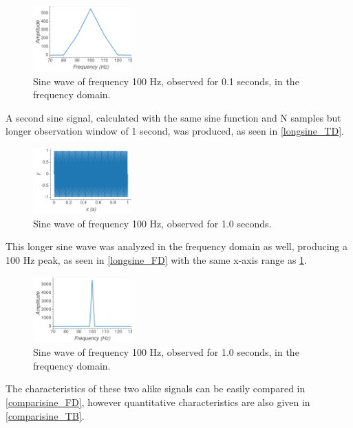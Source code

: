 \documentclass[aps,prl,reprint]{revtex4-2}
\begin{document}
\begin{figure}[h]
\includegraphics[width=0.34\textwidth]{../Images/l5_A_1b.png}
\caption{\label{shortsine_FD} Sine wave of frequency 100 Hz, observed for 0.1 seconds, in the frequency domain.}
\end{figure}

A second sine signal, calculated with the same sine function and N samples
but longer observation window of 1 second, was produced, as seen in 
\ref{longsine_TD}.

\begin{figure}[h]
\includegraphics[width=0.34\textwidth]{../Images/l5_A_2a.png}
\caption{\label{shortsine_TD} Sine wave of frequency 100 Hz, observed for 1.0 seconds.}
\end{figure}

This longer sine wave was analyzed in the frequency domain as well, producing
a 100 Hz peak, as seen in \ref{longsine_FD} with the same x-axis range as 
\ref{shortsine_FD}.

\begin{figure}[h]
\includegraphics[width=0.34\textwidth]{../Images/l5_A_2b.png}
\caption{\label{shortsine_TD} Sine wave of frequency 100 Hz, observed for 1.0 seconds, in the frequency domain.}
\end{figure}

The characteristics of these two alike signals can be easily compared in 
\ref{comparisine_FD}, however quantitative characteristics are also given in 
\ref{comparisine_TB}. 
\end{document}
